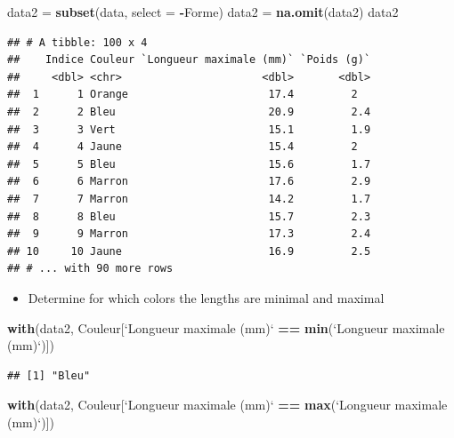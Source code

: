 \documentclass[]{article}
\newenvironment{Shaded}{\begin{snugshade}}{\end{snugshade}}
\newcommand{\KeywordTok}[1]{\textcolor[rgb]{0.13,0.29,0.53}{\textbf{#1}}}
\newcommand{\DataTypeTok}[1]{\textcolor[rgb]{0.13,0.29,0.53}{#1}}
\newcommand{\StringTok}[1]{\textcolor[rgb]{0.31,0.60,0.02}{#1}}
\newcommand{\OperatorTok}[1]{\textcolor[rgb]{0.81,0.36,0.00}{\textbf{#1}}}
\newcommand{\NormalTok}[1]{#1}
\providecommand{\tightlist}{%
  \setlength{\itemsep}{0pt}\setlength{\parskip}{0pt}}
\begin{document}
\begin{Shaded}
\begin{Highlighting}[]
\NormalTok{data2 =}\StringTok{ }\KeywordTok{subset}\NormalTok{(data, }\DataTypeTok{select =} \OperatorTok{-}\NormalTok{Forme)}
\NormalTok{data2 =}\StringTok{ }\KeywordTok{na.omit}\NormalTok{(data2)}
\NormalTok{data2}
\end{Highlighting}
\end{Shaded}

\begin{verbatim}
## # A tibble: 100 x 4
##    Indice Couleur `Longueur maximale (mm)` `Poids (g)`
##     <dbl> <chr>                      <dbl>       <dbl>
##  1      1 Orange                      17.4         2  
##  2      2 Bleu                        20.9         2.4
##  3      3 Vert                        15.1         1.9
##  4      4 Jaune                       15.4         2  
##  5      5 Bleu                        15.6         1.7
##  6      6 Marron                      17.6         2.9
##  7      7 Marron                      14.2         1.7
##  8      8 Bleu                        15.7         2.3
##  9      9 Marron                      17.3         2.4
## 10     10 Jaune                       16.9         2.5
## # ... with 90 more rows
\end{verbatim}

\begin{itemize}
\tightlist
\item
  Determine for which colors the lengths are minimal and maximal
\end{itemize}

\begin{Shaded}
\begin{Highlighting}[]
\KeywordTok{with}\NormalTok{(data2, Couleur[}\StringTok{`}\DataTypeTok{Longueur maximale (mm)}\StringTok{`} \OperatorTok{==}\StringTok{ }\KeywordTok{min}\NormalTok{(}\StringTok{`}\DataTypeTok{Longueur maximale (mm)}\StringTok{`}\NormalTok{)])}
\end{Highlighting}
\end{Shaded}

\begin{verbatim}
## [1] "Bleu"
\end{verbatim}

\begin{Shaded}
\begin{Highlighting}[]
\KeywordTok{with}\NormalTok{(data2, Couleur[}\StringTok{`}\DataTypeTok{Longueur maximale (mm)}\StringTok{`} \OperatorTok{==}\StringTok{ }\KeywordTok{max}\NormalTok{(}\StringTok{`}\DataTypeTok{Longueur maximale (mm)}\StringTok{`}\NormalTok{)])}
\end{Highlighting}
\end{Shaded}
\end{document}
